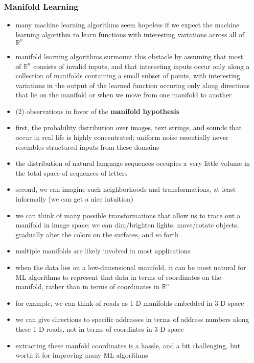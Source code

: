 \documentclass[11pt, twocolumn]{report}
\def\realnumbers{\mathbb{R}}
\begin{document}
\subsubsection{Manifold Learning}
\begin{itemize}
  \item many machine learning algorithms seem hopeless if we expect the machine
    learning algorithm to learn functions with interesting variations across
    all of $\realnumbers^n$
  \item manifold learning algorithms surmount this obstacle by assuming that
    most of $\realnumbers^n$ consists of invalid inputs, and that interesting
    inputs occur only along a collection of manifolds containing a small subset
    of points, with interesting variations in the output of the learned
    function occuring only along directions that lie on the manifold or when we
    move from one manifold to another
  \item (2) observations in favor of the \textbf{manifold hypothesis}
  \item first, the probability distribution over images, text strings, and
    sounds that occur in real life is highly concentrated; uniform noise
    essentially never resembles structured inputs from these domains
  \item the distribution of natural language sequences occupies a very little
    volume in the total space of sequences of letters
  \item second, we can imagine such neighborhoods and transformations, at least
    informally (we can get a nice intuition)
  \item we can think of many possible transformations that allow us to trace
    out a manifold in image space: we can dim/brighten lights, move/rotate
    objects, gradually alter the colors on the surfaces, and so forth
  \item multiple manifolds are likely involved in most applications
  \item when the data lies on a low-dimensional manifold, it can be most
    natural for ML algorithms to represent that data in terms of coordinates on
    the manifold, rather than in terms of coordinates in $\realnumbers^n$
  \item for example, we can think of roads as 1-D manifolds embedded in 3-D
    space
  \item we can give directions to specific addresses in terms of address
    numbers along these 1-D roads, not in terms of coordintes in 3-D space
  \item extracting these manfold coordinates is a hassle, and a bit
    challenging, but worth it for improving many ML algorithms
\end{itemize}
\end{document}
